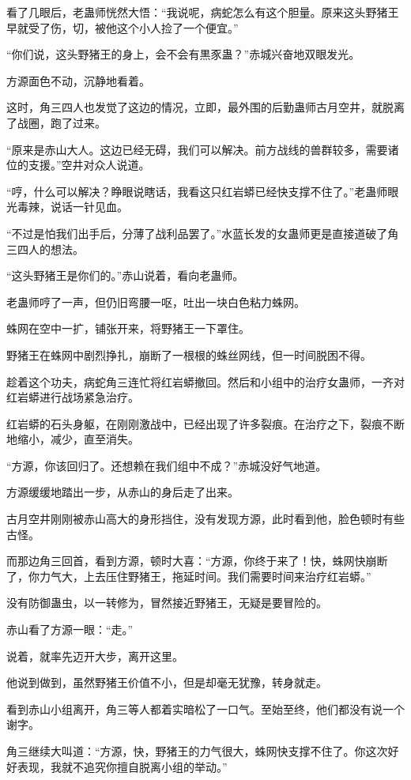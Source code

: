 \begin{this_body}
看了几眼后，老蛊师恍然大悟：“我说呢，病蛇怎么有这个胆量。原来这头野猪王早就受了伤，切，被他这个小人捡了一个便宜。”

“你们说，这头野猪王的身上，会不会有黒豕蛊？”赤城兴奋地双眼发光。

方源面色不动，沉静地看着。

这时，角三四人也发觉了这边的情况，立即，最外围的后勤蛊师古月空井，就脱离了战圈，跑了过来。

“原来是赤山大人。这边已经无碍，我们可以解决。前方战线的兽群较多，需要诸位的支援。”空井对众人说道。

“哼，什么可以解决？睁眼说瞎话，我看这只红岩蟒已经快支撑不住了。”老蛊师眼光毒辣，说话一针见血。

“不过是怕我们出手后，分薄了战利品罢了。”水蓝长发的女蛊师更是直接道破了角三四人的想法。

“这头野猪王是你们的。”赤山说着，看向老蛊师。

老蛊师哼了一声，但仍旧弯腰一呕，吐出一块白色粘力蛛网。

蛛网在空中一扩，铺张开来，将野猪王一下罩住。

野猪王在蛛网中剧烈挣扎，崩断了一根根的蛛丝网线，但一时间脱困不得。

趁着这个功夫，病蛇角三连忙将红岩蟒撤回。然后和小组中的治疗女蛊师，一齐对红岩蟒进行战场紧急治疗。

红岩蟒的石头身躯，在刚刚激战中，已经出现了许多裂痕。在治疗之下，裂痕不断地缩小，减少，直至消失。

“方源，你该回归了。还想赖在我们组中不成？”赤城没好气地道。

方源缓缓地踏出一步，从赤山的身后走了出来。

古月空井刚刚被赤山高大的身形挡住，没有发现方源，此时看到他，脸色顿时有些古怪。

而那边角三回首，看到方源，顿时大喜：“方源，你终于来了！快，蛛网快崩断了，你力气大，上去压住野猪王，拖延时间。我们需要时间来治疗红岩蟒。”

没有防御蛊虫，以一转修为，冒然接近野猪王，无疑是要冒险的。

赤山看了方源一眼：“走。”

说着，就率先迈开大步，离开这里。

他说到做到，虽然野猪王价值不小，但是却毫无犹豫，转身就走。

看到赤山小组离开，角三等人都着实暗松了一口气。至始至终，他们都没有说一个谢字。

角三继续大叫道：“方源，快，野猪王的力气很大，蛛网快支撑不住了。你这次好好表现，我就不追究你擅自脱离小组的举动。”


\end{this_body}
